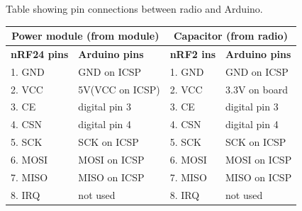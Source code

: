 \documentclass[12pt]{article}
\begin{document}
\begin{center}
	Table showing pin connections between radio and Arduino.
	\begin{tabularx}{\textwidth}{ |X|X||X|X| }
		\hline
		\multicolumn{2}{|c||}{\textbf{Power module (from module)}} & \multicolumn{2}{|c|}{\textbf{Capacitor (from radio)}}\\
		\hline
		\textbf{nRF24 pins} & \textbf{Arduino pins} & \textbf{nRF2 ins} & \textbf{Arduino pins}\\ 
		\hline
		1. GND & GND on ICSP & 1. GND & GND on ICSP \\ 
		\hline
		2. VCC & 5V(VCC on ICSP) & 2. VCC & 3.3V on board \\ 
		\hline
		3. CE & digital pin 3 & 3. CE & digital pin 3 \\ 
		\hline
		4. CSN & digital pin 4 & 4. CSN & digital pin 4 \\ 
		\hline
		5. SCK & SCK on ICSP & 5. SCK & SCK on ICSP \\ 
		\hline
		6. MOSI & MOSI on ICSP & 6. MOSI & MOSI on ICSP \\ 
		\hline
		7. MISO & MISO on ICSP & 7. MISO & MISO on ICSP \\ 
		\hline
		8. IRQ & not used & 8. IRQ & not used \\ 
		\hline
	\end{tabularx}
\end{center}
\end{document}

